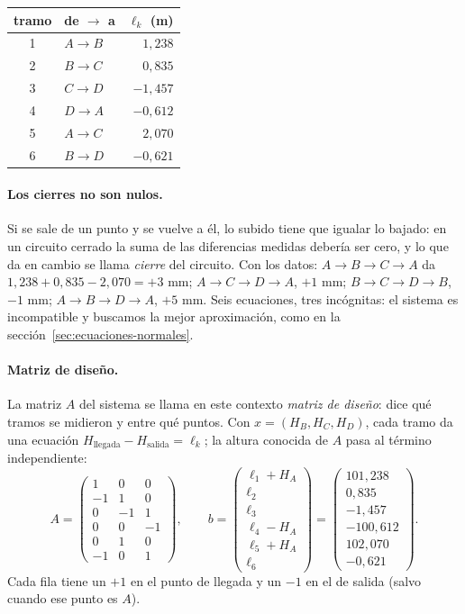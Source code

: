 \begin{center}
\small
\begin{tabular}{clr}
\toprule
tramo & de \(\to\) a & \(\ell_k\) (m)\\
\midrule
1 & \(A\to B\) & \(1{,}238\)\\
2 & \(B\to C\) & \(0{,}835\)\\
3 & \(C\to D\) & \(-1{,}457\)\\
4 & \(D\to A\) & \(-0{,}612\)\\
5 & \(A\to C\) & \(2{,}070\)\\
6 & \(B\to D\) & \(-0{,}621\)\\
\bottomrule
\end{tabular}
\end{center}

\paragraph{Los cierres no son nulos.} Si se sale de un punto y se vuelve a él, lo subido
tiene que igualar lo bajado: en un circuito cerrado la suma de las diferencias medidas
debería ser cero, y lo que da en cambio se llama \emph{cierre} del circuito. Con los datos: \(A\to B\to C\to A\) da \(1{,}238+0{,}835-2{,}070=+3\) mm;
\(A\to C\to D\to A\), \(+1\) mm; \(B\to C\to D\to B\), \(-1\) mm; \(A\to B\to D\to A\),
\(+5\) mm. Seis ecuaciones, tres incógnitas: el sistema es incompatible y buscamos la mejor
aproximación, como en la sección~\ref{sec:ecuaciones-normales}.

\paragraph{Matriz de diseño.} La matriz \(A\) del sistema se llama en este contexto
\emph{matriz de diseño}: dice qué tramos se midieron y entre qué puntos. Con
\(x=(H_B,H_C,H_D)\), cada tramo da una ecuación
\(H_{\text{llegada}}-H_{\text{salida}}=\ell_k\); la altura conocida de \(A\) pasa al término
independiente:
\[
  A=\begin{pmatrix}1&0&0\\-1&1&0\\0&-1&1\\0&0&-1\\0&1&0\\-1&0&1\end{pmatrix},\qquad
  b=\begin{pmatrix}\ell_1+H_A\\ \ell_2\\ \ell_3\\ \ell_4-H_A\\ \ell_5+H_A\\ \ell_6\end{pmatrix}
  =\begin{pmatrix}101{,}238\\0{,}835\\-1{,}457\\-100{,}612\\102{,}070\\-0{,}621\end{pmatrix}.
\]
Cada fila tiene un \(+1\) en el punto de llegada y un \(-1\) en el de salida (salvo cuando
ese punto es \(A\)).


